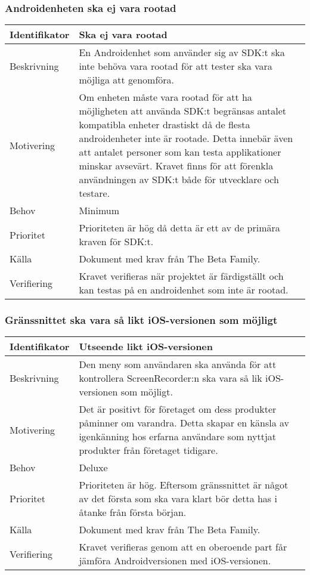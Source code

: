 \subsubsection{Androidenheten ska ej vara rootad}
\begin{tabular}{ | p{65pt} | p{300pt} |}
  \hline
  Identifikator &
  Ska ej vara rootad
  \\ \hline
  Beskrivning & 
  En Androidenhet som använder sig av SDK:t ska inte behöva vara rootad för att tester ska vara möjliga att genomföra.
  \\ \hline
  Motivering &
  Om enheten måste vara rootad för att ha möjligheten att använda SDK:t begränsas antalet kompatibla enheter drastiskt då de flesta androidenheter inte är rootade. Detta innebär även att antalet personer som kan testa applikationer minskar avsevärt. Kravet finns för att förenkla användningen av SDK:t både för utvecklare och testare.
  \\ \hline
  Behov &
  Minimum
  \\ \hline
  Prioritet &
  Prioriteten är hög då detta är ett av de primära kraven för SDK:t.
  \\ \hline
  Källa &
  Dokument med krav från The Beta Family.
  \\ \hline
  Verifiering &
  Kravet verifieras när projektet är färdigställt och kan testas på en androidenhet som inte är rootad.
  \\ \hline
\end{tabular}

\subsubsection{Gränssnittet ska vara så likt iOS-versionen som möjligt}
\begin{tabular}{ | p{65pt} | p{300pt} |}
  \hline
  Identifikator &
  Utseende likt iOS-versionen
  \\ \hline
  Beskrivning & 
  Den meny som användaren ska använda för att kontrollera ScreenRecorder:n ska vara så lik iOS-versionen som möjligt.
  \\ \hline
  Motivering &
  Det är positivt för företaget om dess produkter påminner om varandra. Detta skapar en känsla av igenkänning hos erfarna användare som nyttjat produkter från företaget tidigare.
  \\ \hline
  Behov &
  Deluxe
  \\ \hline
  Prioritet &
  Prioriteten är hög. Eftersom gränssnittet är något av det första som ska vara klart bör detta has i åtanke från första början.
  \\ \hline
  Källa &
  Dokument med krav från The Beta Family.
  \\ \hline
  Verifiering &
  Kravet verifieras genom att en oberoende part får jämföra Androidversionen med iOS-versionen.
  \\ \hline
\end{tabular}

